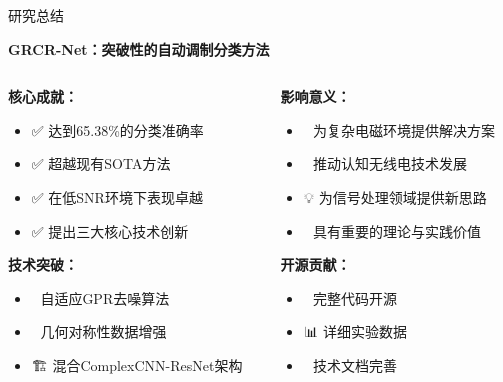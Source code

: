 \documentclass[aspectratio=169]{beamer}
\begin{document}
\begin{frame}{研究总结}
\begin{center}
\textcolor{zjutblue}{\Large \textbf{GRCR-Net：突破性的自动调制分类方法}}
\end{center}

\vspace{0.5cm}
\begin{columns}
\begin{column}{0.5\textwidth}
\textbf{核心成就：}
\begin{itemize}
\item ✅ 达到65.38\%的分类准确率
\item ✅ 超越现有SOTA方法
\item ✅ 在低SNR环境下表现卓越
\item ✅ 提出三大核心技术创新
\end{itemize}

\textbf{技术突破：}
\begin{itemize}
\item 🔬 自适应GPR去噪算法
\item 🔄 几何对称性数据增强
\item 🏗️ 混合ComplexCNN-ResNet架构
\end{itemize}
\end{column}
\begin{column}{0.5\textwidth}
\textbf{影响意义：}
\begin{itemize}
\item 🎯 为复杂电磁环境提供解决方案
\item 🚀 推动认知无线电技术发展
\item 💡 为信号处理领域提供新思路
\item 🌟 具有重要的理论与实践价值
\end{itemize}

\textbf{开源贡献：}
\begin{itemize}
\item 📂 完整代码开源
\item 📊 详细实验数据
\item 📖 技术文档完善
\end{itemize}
\end{column}
\end{columns}
\end{frame}
\end{document}
